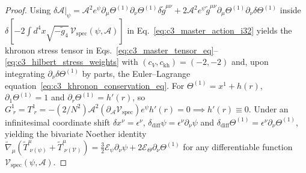 \documentclass[11pt,a4paper]{article}
\theoremstyle{definition}
\theoremstyle{plain}
\theoremstyle{remark}
\begin{document}
\begin{proof}
Using $\left.\delta\mathcal{A}\right|_\psi = \mathcal{A}^2 e^\psi\partial_\mu\Theta^{(1)}\partial_\nu\Theta^{(1)}\delta\tilde{g}^{\mu\nu} + 2\mathcal{A}^2 e^\psi\tilde{g}^{\mu\nu}\partial_\mu\Theta^{(1)}\partial_\nu\delta\Theta^{(1)}$ inside $\delta\!\left[-2\int d^4x\sqrt{-\tilde{g}_4}\,\mathcal{V}_{\mathrm{spec}}(\psi, \mathcal{A})\right]$ in Eq.~\eqref{eq:c3_master_action_i32} yields the khronon stress tensor in Eqs.~\eqref{eq:c3_master_tensor_eq}--\eqref{eq:c3_hilbert_stress_weights} with $(c_V, c_{\mathrm{kh}}) = (-2, -2)$ and, upon integrating $\partial_\nu\delta\Theta^{(1)}$ by parts, the Euler--Lagrange equation~\eqref{eq:c3_khronon_conservation_eq}. For $\Theta^{(1)} = x^1 + h(r)$, $\partial_1\Theta^{(1)} = 1$ and $\partial_r\Theta^{(1)} = h'(r)$, so $G^1_{\;r} = T^1_{\;r} = -(2/N^2)\mathcal{A}^2(\partial_{\mathcal{A}}\mathcal{V}_{\mathrm{spec}})e^\psi h'(r) = 0 \implies h'(r) \equiv 0$. Under an infinitesimal coordinate shift $\delta x^\nu = \epsilon^\nu$, $\delta_{\mathrm{diff}}\psi = \epsilon^\nu\partial_\nu\psi$ and $\delta_{\mathrm{diff}}\Theta^{(1)} = \epsilon^\nu\partial_\nu\Theta^{(1)}$, yielding the bivariate Noether identity $\tilde{\nabla}_\mu(\tilde{T}^\mu_{\;\nu(\psi)} + \tilde{T}^\mu_{\;\nu(\mathcal{V})}) = \frac{3}{2}\mathcal{E}_\psi\partial_\nu\psi + 2\mathcal{E}_\Theta\partial_\nu\Theta^{(1)}$ for any differentiable function $\mathcal{V}_{\mathrm{spec}}(\psi, \mathcal{A})$.
\end{proof}
\end{document}
